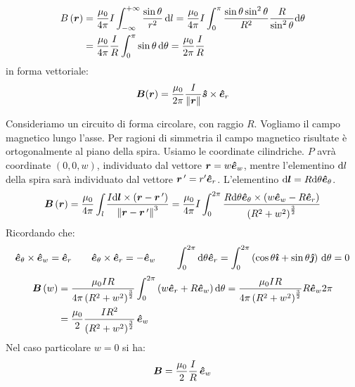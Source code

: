 \begin{align*}
  B\left(\boldsymbol{r}\right) & =\frac{\mu_0}{4\pi}I\int_{-\infty}^{+\infty}\frac{\sin\theta}{r^2}\,\mathrm{d} l=\frac{\mu_0}{4\pi}I\int_{0}^{\pi}\frac{\sin\theta\sin^2\theta}{R^2}\frac{R}{\sin^2\theta}\mathrm{d}\theta \\
                      & =\frac{\mu_0}{4\pi}\frac{I}{R}\int_0^\pi\sin\theta\,\mathrm{d}\theta=\frac{\mu_0}{2\pi}\frac{I}{R}
\end{align*}
in forma vettoriale:
\begin{equation}
  \boldsymbol{B}(\boldsymbol{r})=\frac{\mu_0}{2\pi}\frac{I}{\left\lVert\boldsymbol{r}\right\rVert}\boldsymbol{\hat {s}}\times{\boldsymbol{\hat {e}}_r}
\end{equation}
\begin{Es}
  Consideriamo un circuito di forma circolare, con raggio $R$. Vogliamo il campo magnetico lungo l'asse. Per ragioni di simmetria il campo magnetico risultate è ortogonalmente al piano della spira. Usiamo le coordinate cilindriche. $P$ avrà coordinate $(0,0,w)$, individuato dal vettore $\boldsymbol{r}=w \boldsymbol{\hat {e}}_w$, mentre l'elementino $\mathrm{d} l$ della spira sarà individuato dal vettore $\boldsymbol{r}\,'=r'\boldsymbol{\hat {e}}_r$. L'elementino $\mathrm{d}\boldsymbol{l}=R\mathrm{d}\theta\boldsymbol{\hat {e}}_\theta$.
  \[\boldsymbol{B}\left(\boldsymbol{r}\right)=\frac{\mu_0}{4\pi}\int_l\frac{I\mathrm{d}\boldsymbol{l}\times\left(\boldsymbol{r}-\boldsymbol{r}\,'\right)}{\left\lVert\boldsymbol{r}-\boldsymbol{r}\,'\right\rVert^3}=\frac{\mu_0}{4\pi}I\int_0^{2\pi}\frac{R\mathrm{d}\theta\boldsymbol{\hat {e}}_\theta\times\left(w\boldsymbol{\hat {e}}_w-R\boldsymbol{\hat {e}}_r\right)}{\left(R^2+w^2\right)^{\frac{3}{2}}}\]
  Ricordando che:
  \[\boldsymbol{\hat {e}}_\theta\times\boldsymbol{\hat {e}}_w=\boldsymbol{\hat {e}}_r\qquad \boldsymbol{\hat {e}}_\theta\times\boldsymbol{\hat {e}}_r=-\boldsymbol{\hat {e}}_w\qquad \int_0^{2\pi} \mathrm{d}\theta\boldsymbol{\hat {e}}_r=\int_0^{2\pi}\left(\cos\theta\boldsymbol{\hat {\imath}}+\sin\theta\boldsymbol{\hat {\jmath}}\right)\,\mathrm{d} \theta=0\]
  \begin{equation}
    \label{eq:b_spira}
    \begin{aligned}
      \boldsymbol{B}\left(w\right) & =\frac{\mu_0IR}{4\pi\left(R^2+w^2\right)^{\frac{3}{2}}}\int_0^{2\pi}\left(w\boldsymbol{\hat {e}}_r+R\boldsymbol{\hat {e}}_w\right)\mathrm{d}\theta=\frac{\mu_0IR}{4\pi\left(R^2+w^2\right)^{\frac{3}{2}}}R\boldsymbol{\hat {e}}_w 2\pi \\
                          & =\frac{\mu_0}{2}\frac{IR^2}{\left(R^2+w^2\right)^{\frac{3}{2}}}\,\boldsymbol{\hat {e}}_w
    \end{aligned}
  \end{equation}
  Nel caso particolare $w=0$ si ha:
  \[\boldsymbol{B}=\frac{\mu_0}{2}\frac{I}{R}\,\boldsymbol{\hat {e}}_w\]
\end{Es}
